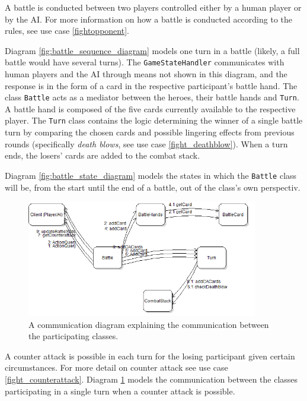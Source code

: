 A battle is conducted between two players controlled either by a human player or by the AI. For more information on how a battle is conducted according to the rules, see use case \ref{fightopponent}.

Diagram \ref{fig:battle_sequence_diagram} models one turn in a battle (likely, a full battle would have several turns). The \texttt{GameStateHandler} communicates with human players and the AI through means not shown in this diagram, and the response is in the form of a card in the respective participant's battle hand. The class \texttt{Battle} acts as a mediator between the heroes, their battle hands and \texttt{Turn}. A battle hand is composed of the five cards currently available to the respective player. The \texttt{Turn} class contains the logic determining the winner of a single battle turn by comparing the chosen cards and possible lingering effects from previous rounds (specifically \emph{death blows}, see use case \ref{fight_deathblow}). When a turn ends, the losers' cards are added to the combat stack.

Diagram \ref{fig:battle_state_diagram} models the states in which the \texttt{Battle} class will be, from the start until the end of a battle, out of the class's own perspectiv.

\begin{figure}[h]
\center
\includegraphics[width=0.9\textwidth]{diagrams/CounterAttackCommDiagram.png}
\caption{A communication diagram explaining the communication between the participating classes.}
\label{fig:counter_attack_comm_diagram}
\end{figure}

A counter attack is possible in each turn for the losing participant given certain circumstances. For more detail on counter attack see use case \ref{fight_counterattack}. Diagram \ref{fig:counter_attack_comm_diagram} models the communication between the classes participating in a single turn when a counter attack is possible.


